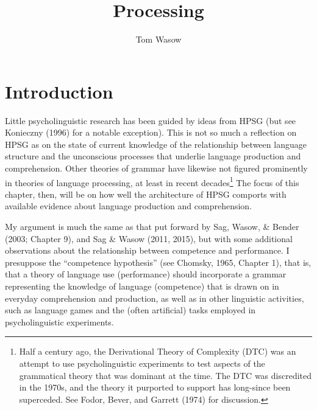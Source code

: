 \documentclass[a4paper]{article}
\title{Processing}
\author{Tom Wasow}
\begin{document}
\maketitle


\section{Introduction}

Little psycholinguistic research has been guided by ideas from HPSG (but see  Konieczny (1996) for a notable exception).  This is not so much a reflection on HPSG as on the state of current knowledge of the relationship between language structure and the unconscious processes that underlie language production and comprehension.  Other theories of grammar have likewise not figured prominently in theories of language processing, at least in recent decades\footnote{Half a century ago, the Derivational Theory of Complexity (DTC) was an attempt to use psycholinguistic experiments to test aspects of the grammatical theory that was dominant at the time.  The DTC was discredited in the 1970s, and the theory it purported to support has long-since been superceded.  See Fodor, Bever, and Garrett (1974) for discussion.}  The focus of this chapter, then, will be on how well the architecture of HPSG comports with available evidence about language production and comprehension.  

My argument is much the same as that put forward by Sag, Wasow, \& Bender (2003; Chapter 9), and Sag \& Wasow (2011, 2015), but with some additional observations about the relationship between competence and performance. I presuppose the ``competence hypothesis'' (see Chomsky, 1965, Chapter 1), that is, that a theory of language use (performance) should incorporate a grammar representing the knowledge of language (competence) that is drawn on in everyday comprehension and production, as well as in other linguistic activities, such as language games and the (often artificial) tasks employed in psycholinguistic experiments.  
\end{document}
